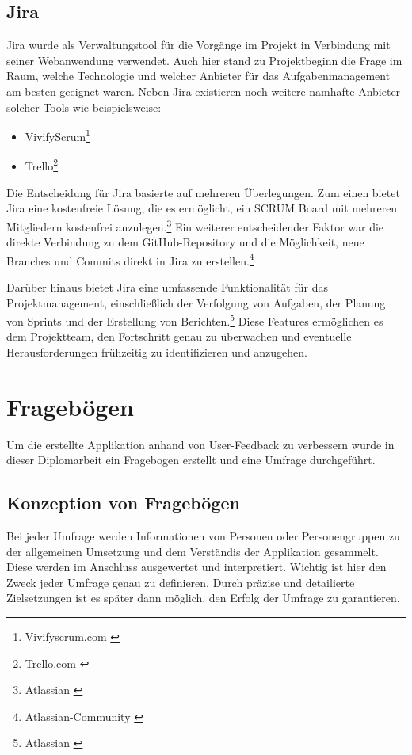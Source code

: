 \subsection{Jira}
Jira wurde als Verwaltungstool für die Vorgänge im Projekt in Verbindung mit seiner Webanwendung verwendet. Auch hier
stand zu Projektbeginn die Frage im Raum, welche Technologie und welcher Anbieter für das Aufgabenmanagement am besten
geeignet waren. Neben Jira existieren noch weitere namhafte Anbieter solcher Tools wie beispielsweise:
\begin{itemize}
    \item VivifyScrum\footnote{Vivifyscrum.com \cite{VivifyScrum Website}}
    \item Trello\footnote{Trello.com \cite{Trello Website}}
\end{itemize}

Die Entscheidung für Jira basierte auf mehreren Überlegungen. Zum einen bietet Jira eine kostenfreie Lösung, die es
ermöglicht, ein SCRUM Board mit mehreren Mitgliedern kostenfrei anzulegen.\footnote{Atlassian \cite{Tarife und Preise vergleichen}}  Ein weiterer entscheidender Faktor war die
direkte Verbindung zu dem GitHub-Repository und die Möglichkeit, neue Branches und Commits direkt in Jira zu erstellen.\footnote{Atlassian-Community \cite{How to connect a GitHub account to Jira Software}}

Darüber hinaus bietet Jira eine umfassende Funktionalität für das Projektmanagement, einschließlich der Verfolgung von
Aufgaben, der Planung von Sprints und der Erstellung von Berichten.\footnote{Atlassian \cite{Im Team schneller vorankommen, an einem Strang ziehen und besser entwickeln}} Diese Features ermöglichen es dem Projektteam, den
Fortschritt genau zu überwachen und eventuelle Herausforderungen frühzeitig zu identifizieren und anzugehen.

\section{Fragebögen}
Um die erstellte Applikation anhand von User-Feedback zu verbessern wurde in dieser Diplomarbeit ein Fragebogen erstellt
und eine Umfrage durchgeführt.

\subsection{Konzeption von Fragebögen}
Bei jeder Umfrage werden Informationen von Personen oder Personengruppen zu der allgemeinen
Umsetzung und dem Verständis der Applikation gesammelt. Diese werden im Anschluss ausgewertet und
interpretiert. Wichtig ist hier den Zweck jeder Umfrage genau zu definieren. Durch präzise und
detailierte Zielsetzungen ist es später dann möglich, den Erfolg der Umfrage zu garantieren.

